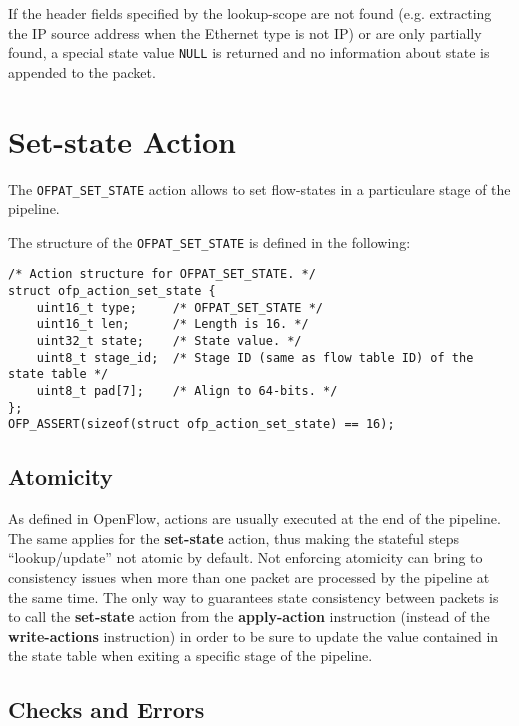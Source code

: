 If the header fields specified by the lookup-scope are not found (e.g. extracting the IP source address when the Ethernet type is not IP) or are only partially found, a special state value \texttt{NULL} is returned and no information about state is appended to the packet.

\section{Set-state Action}
\label{sec:act_set_state}

The \texttt{OFPAT\_SET\_STATE} action allows to set flow-states in a particulare stage of the pipeline.

The structure of the \texttt{OFPAT\_SET\_STATE} is defined in the following:

\begin{verbatim}
/* Action structure for OFPAT_SET_STATE. */
struct ofp_action_set_state {
    uint16_t type;     /* OFPAT_SET_STATE */
    uint16_t len;      /* Length is 16. */
    uint32_t state;    /* State value. */
    uint8_t stage_id;  /* Stage ID (same as flow table ID) of the state table */
    uint8_t pad[7];    /* Align to 64-bits. */
};
OFP_ASSERT(sizeof(struct ofp_action_set_state) == 16);
\end{verbatim}


\subsection{Atomicity}
As defined in OpenFlow, actions are usually executed at the end of the pipeline. The same applies for the \textbf{set-state} action, thus making the stateful steps ``lookup/update'' not atomic by default. Not enforcing atomicity can bring to consistency issues when more than one packet are processed by the pipeline at the same time. The only way to guarantees state consistency between packets is to call the \textbf{set-state} action from the \textbf{apply-action} instruction (instead of the \textbf{write-actions} instruction) in order to be sure to update the value contained in the state table when exiting a specific stage of the pipeline.

\subsection{Checks and Errors}

